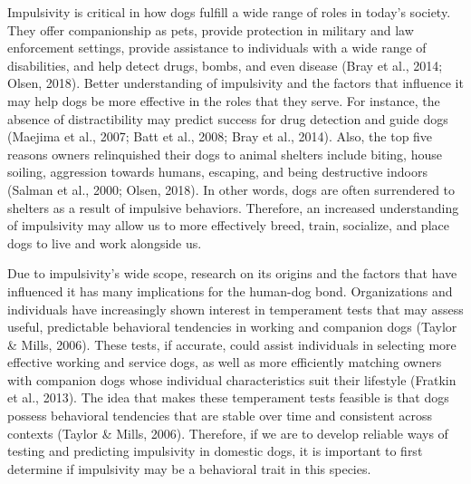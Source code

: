 \documentclass[
  ,pub,floatsintext]{apa6}
\begin{document}
Impulsivity is critical in how dogs fulfill a wide range of roles in today's society. They offer companionship as pets, provide protection in military and law enforcement settings, provide assistance to individuals with a wide range of disabilities, and help detect drugs, bombs, and even disease (Bray et al., 2014; Olsen, 2018). Better understanding of impulsivity and the factors that influence it may help dogs be more effective in the roles that they serve. For instance, the absence of distractibility may predict success for drug detection and guide dogs (Maejima et al., 2007; Batt et al., 2008; Bray et al., 2014). Also, the top five reasons owners relinquished their dogs to animal shelters include biting, house soiling, aggression towards humans, escaping, and being destructive indoors (Salman et al., 2000; Olsen, 2018). In other words, dogs are often surrendered to shelters as a result of impulsive behaviors. Therefore, an increased understanding of impulsivity may allow us to more effectively breed, train, socialize, and place dogs to live and work alongside us.

Due to impulsivity's wide scope, research on its origins and the factors that have influenced it has many implications for the human-dog bond. Organizations and individuals have increasingly shown interest in temperament tests that may assess useful, predictable behavioral tendencies in working and companion dogs (Taylor \& Mills, 2006). These tests, if accurate, could assist individuals in selecting more effective working and service dogs, as well as more efficiently matching owners with companion dogs whose individual characteristics suit their lifestyle (Fratkin et al., 2013). The idea that makes these temperament tests feasible is that dogs possess behavioral tendencies that are stable over time and consistent across contexts (Taylor \& Mills, 2006). Therefore, if we are to develop reliable ways of testing and predicting impulsivity in domestic dogs, it is important to first determine if impulsivity may be a behavioral trait in this species.
\end{document}
